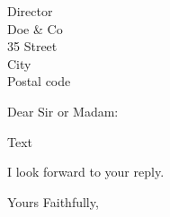 \documentclass[11pt,a4paper]{letter}
\begin{document}
\begin{letter}{Director \\ Doe \& Co \\ 35 Street
\\ City \\ Postal code}
\opening{Dear Sir or Madam:}

Text

I look forward to your reply.

\closing{Yours Faithfully,}

\end{letter}
\end{document}
